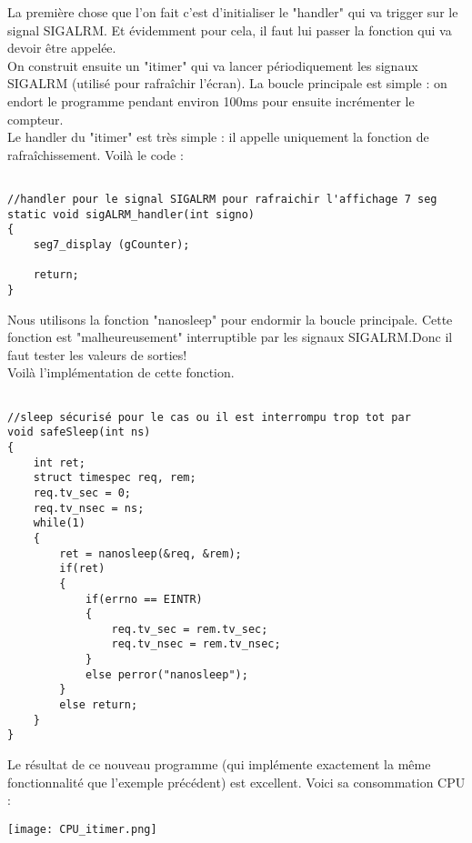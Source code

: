 La première chose que l'on fait c'est d'initialiser le "handler" qui va trigger sur le signal SIGALRM. Et évidemment pour cela, il faut lui passer la fonction qui va devoir être appelée.\\
 

On construit ensuite un "itimer" qui va lancer périodiquement les signaux SIGALRM (utilisé pour rafraîchir l'écran).
La boucle principale est simple : on endort le programme pendant environ 100ms pour ensuite incrémenter le compteur.\\


Le handler du "itimer" est très simple : il appelle uniquement la fonction de rafraîchissement. Voilà le code :

\begin{lstlisting}[frame=single,style=C]  % Start your code-block

//handler pour le signal SIGALRM pour rafraichir l'affichage 7 seg
static void sigALRM_handler(int signo)
{
	seg7_display (gCounter);
	
	return;
}
\end{lstlisting}


Nous utilisons la fonction "nanosleep" pour endormir la boucle principale. Cette fonction est "malheureusement" interruptible par les signaux SIGALRM.Donc il faut tester les valeurs de sorties!\\


Voilà l'implémentation de cette fonction.

 
\begin{lstlisting}[frame=single,style=C]  % Start your code-block

//sleep sécurisé pour le cas ou il est interrompu trop tot par
void safeSleep(int ns)
{
	int ret;
	struct timespec req, rem;
	req.tv_sec = 0;
	req.tv_nsec = ns;
	while(1)
	{
		ret = nanosleep(&req, &rem);
		if(ret)
		{
			if(errno == EINTR)
			{
				req.tv_sec = rem.tv_sec;
				req.tv_nsec = rem.tv_nsec;
			}
			else perror("nanosleep");
		}
		else return;
	}
}
\end{lstlisting}

\pagebreak Le résultat de ce nouveau programme (qui implémente exactement la même fonctionnalité que l'exemple précédent) est excellent. Voici sa consommation CPU :

\begin{center} 
\hspace{12.45cm}
\texttt{[image: CPU\_itimer.png]}
\end{center}
\vspace{1cm}


